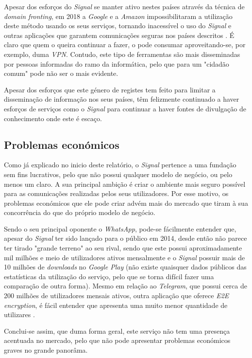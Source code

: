 Apesar dos esforços do \textit{Signal} se manter ativo nestes países através da técnica de \textit{domain fronting}, em 2018 a \textit{Google} e a \textit{Amazon} impossibilitaram a utilização deste método usando os seus serviços, tornando inacessível o uso do \textit{Signal} e outras aplicações que garantem comunicações seguras nos países descritos \cite{signal_amazon_letter}. É claro que quem o queira continuar a fazer, o pode consumar aproveitando-se, por exemplo, duma \textit{VPN}. Contudo, este tipo de ferramentas são mais disseminadas por pessoas informadas do ramo da informática, pelo que para um "cidadão comum" pode não ser o mais evidente.

Apesar dos esforços que este género de registes tem feito para limitar a disseminação de informação nos seus países, têm felizmente continuado a haver esforços de serviços como o \textit{Signal} para continuar a haver fontes de divulgação de conhecimento onde este é escaço.


\subsection{Problemas económicos}
Como já explicado no inicio deste relatório, o \textit{Signal} pertence a uma fundação sem fins lucrativos, pelo que não possui qualquer modelo de negócio, ou pelo menos um claro. A sua principal ambição é criar o ambiente mais seguro possível para as comunicações realizadas pelos seus utilizadores. Por esse motivo, os problemas económicos que ele pode criar advém mais do mercado que tiram à sua concorrência do que do próprio modelo de negócio.

Sendo o seu principal oponente o \textit{WhatsApp}, pode-se fácilmente entender que, apesar do \textit{Signal} ter sido lançado para o público em 2014, desde então não parece ter tirado "grande terreno" ao seu rival, sendo que este possui aproximadamente mil milhões e meio de utilizadores ativos mensalmente e o \textit{Signal} possuir mais de 10 milhões de \textit{downloads} no \textit{Google Play} (não existe quaisquer dados públicos das estatísticas da utilização do serviço, pelo que se torna difícil fazer uma comparação de outra forma). Mesmo em relação ao \textit{Telegram}, que possui cerca de 200 milhões de utilizadores mensais ativos, outra aplicação que oferece \textit{E2E encryption}, é fácil entender que apresenta uma muito menor quantidade de utilizares \cite{other_apps_statistics}. 

Conclui-se assim, que duma forma geral, este serviço não tem uma presença acentuada no mercado, pelo que não pode apresentar problemas económicos graves no grande panorâma.

